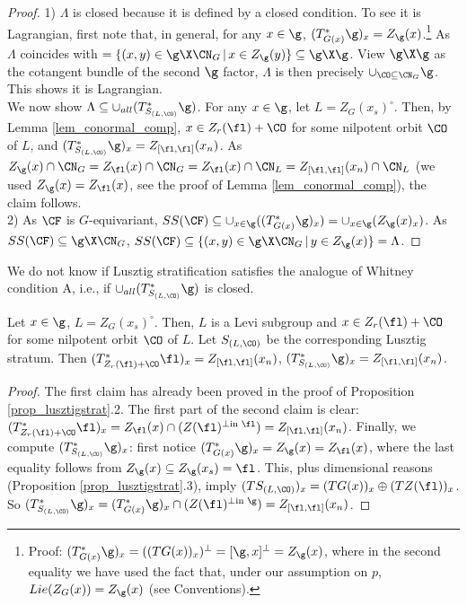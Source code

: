 \begin{proof}
    1) $\Lambda$ is closed because it is defined by a closed condition. To see it is Lagrangian, first note that, in general, for any $x\in\g$, $(T^*_{G(x)}\g)_x=Z_\g(x)$.\footnote{Proof: $(T^*_{G(x)}\g)_x=((TG(x))_x)^\perp=[\g,x]^\perp=Z_\g(x)$, where in the second equality we have used the fact that, under our assumption on $p$, $Lie(Z_G(x))=Z_\g(x)$ (see Conventions).} As $\Lambda$ coincides with $=\{(x,y)\in\g\X\CN_G\,|\, x\in Z_\g(y)\}\subseteq \g\X\g$. View $\g\X\g$ as the cotangent bundle of the second $\g$ factor, $\Lambda$ is then precisely $\cup_{\CO\subseteq\CN_G}\g$. This shows it is Lagrangian.\\
    
    We now show $\Lambda\subseteq\cup_{all} (T^*_{S_{(L,\CO)}}\g)$. For any $x\in\g$, let $L=Z_G(x_s)^\circ$. Then, by Lemma \ref{lem_conormal_comp}, $x\in Z_r(\fl)+\CO$ for some nilpotent orbit $\CO$ of $L$, and $(T^*_{S_{(L,\CO)}}\g)_x=Z_{[\fl,\fl]}(x_n)$. As $Z_\g(x)\cap\CN_G=Z_\fl(x)\cap\CN_G=Z_\fl(x)\cap\CN_L=Z_{[\fl,\fl]}(x_n)\cap\CN_L$ (we used $Z_\g(x)=Z_\fl(x)$, see the proof of Lemma \ref{lem_conormal_comp}), the claim follows.\\

    2) As $\CF$ is $G$-equivariant, $SS(\CF)\subseteq \cup_{x\in \g}((T^*_{G(x)}\g)_x)=\cup_{x\in \g}(Z_\g(x)_x)$. As $SS(\CF)\subseteq \g\X\CN_G$, $SS(\CF)\subseteq\{(x,y)\in\g\X\CN_G\,|\, y\in Z_\g(x)\}=\Lambda$.

\end{proof}

\begin{remark}
    We do not know if Lusztig stratification satisfies the analogue of Whitney condition A, i.e., if $\cup_{all} (T^*_{S_{(L,\CO)}}\g)$ is closed.
\end{remark}

\begin{lemma}\label{lem_conormal_comp}
    Let $x\in\g$, $L=Z_G(x_s)^\circ$. Then, $L$ is a Levi subgroup and $x\in Z_r(\fl)+\CO$ for some nilpotent orbit $\CO$ of $L$. Let $S_{(L,\CO)}$ be the corresponding Lusztig stratum. Then $(T^*_{Z_r(\fl)+\CO}\fl)_x=Z_{[\fl,\fl]}(x_n)$,  $(T^*_{S_{(L,\CO)}}\g)_x=Z_{[\fl,\fl]}(x_n)$.
\end{lemma}

\begin{proof}
    The first claim has already been proved in the proof of Proposition \ref{prop_lusztigstrat}.2. The first part of the second claim is clear: $(T^*_{Z_r(\fl)+\CO}\fl)_x=Z_\fl(x)\cap (Z(\fl)^{\perp \text{in $\fl$}})=Z_{[\fl,\fl]}(x_n)$. Finally, we compute $(T^*_{S_{(L,\CO)}}\g)_x$: first notice $(T^*_{G(x)}\g)_x=Z_\g(x)=Z_\fl(x)$, where the last equality follows from $Z_\g(x)\subseteq Z_\g(x_s)=\fl$. This, plus dimensional reasons (Proposition \ref{prop_lusztigstrat}.3), imply $(TS_{(L,\CO)})_x=(TG(x))_x\oplus(TZ(\fl))_x$. So $(T^*_{S_{(L,\CO)}}\g)_x=(T^*_{G(x)}\g)_x\cap (Z(\fl)^{\perp \text{in $\g$}})=Z_{[\fl,\fl]}(x_n)$.
    
\end{proof}


